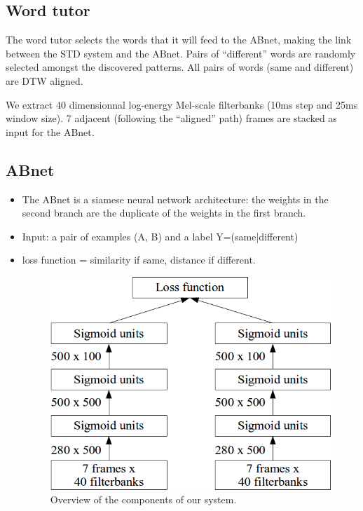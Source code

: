 \documentclass[final]{beamer}
\newcommand{\abnet}{{\sc ABnet}}
\begin{document}
\begin{frame}[t]
\begin{multicols}{3}
\subsection{Word tutor}

The word tutor selects the words that it will feed to the \abnet{}, making the link between the STD system and the \abnet{}.
Pairs of ``different'' words are randomly selected amongst the discovered patterns. All pairs of words (same and different) are DTW aligned.

We extract 40 dimensionnal log-energy Mel-scale filterbanks (10ms step and 25ms window size). 7 adjacent (following the ``aligned'' path) frames are stacked as input for the \abnet{}.

\subsection{ABnet}

\begin{itemize}
\item The \abnet{} is a siamese neural network architecture: the weights in the second branch are the duplicate of the weights in the first branch.
\item Input: a pair of examples (A, B) and a label Y=(same|different)
\item loss function = similarity if same, distance if different.

\begin{figure}[ht!]
  \begin{center}
    \includegraphics[width=0.85\columnwidth]{abnet_cropped.png}
    \caption{\label{fig:system}Overview of the components of our system.}
  \end{center}
\end{figure}


\end{itemize}
\end{multicols}
\end{frame}
\end{document}
